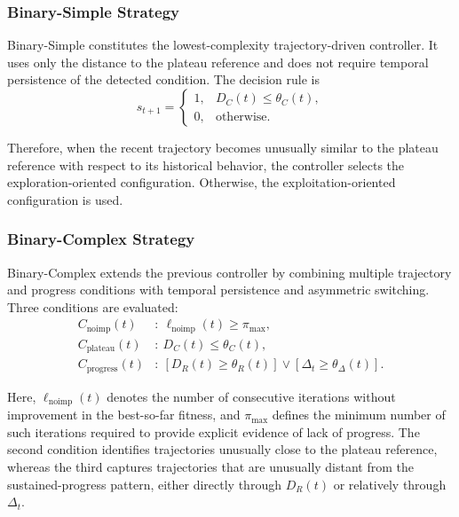 \documentclass[mathematics,article,accept,moreauthors]{Definitions/mdpi}
\begin{document}
\subsubsection{Binary-Simple Strategy}

Binary-Simple constitutes the lowest-complexity trajectory-driven controller.
It uses only the distance to the plateau reference and does not require
temporal persistence of the detected condition. The decision rule is
\begin{equation}
s_{t+1} =
\begin{cases}
1, & D_C(t) \leq \theta_C(t),\\
0, & \text{otherwise}.
\end{cases}
\label{eq:binary_simple}
\end{equation}

Therefore, when the recent trajectory becomes unusually similar to the
plateau reference with respect to its historical behavior, the controller
selects the exploration-oriented configuration. Otherwise, the
exploitation-oriented configuration is used.


\subsubsection{Binary-Complex Strategy}

Binary-Complex extends the previous controller by combining multiple
trajectory and progress conditions with temporal persistence and asymmetric
switching. Three conditions are evaluated:
\begin{align}
C_{\mathrm{noimp}}(t) &:\
\ell_{\mathrm{noimp}}(t) \geq \pi_{\max},
\label{eq:cond_noimp}\\
C_{\mathrm{plateau}}(t) &:\
D_C(t) \leq \theta_C(t),
\label{eq:cond_plateau}\\
C_{\mathrm{progress}}(t) &:\
\left[D_R(t) \geq \theta_R(t)\right]
\lor
\left[\Delta_t \geq \theta_{\Delta}(t)\right].
\label{eq:cond_progress}
\end{align}

Here, $\ell_{\mathrm{noimp}}(t)$ denotes the number of consecutive iterations
without improvement in the best-so-far fitness, and $\pi_{\max}$ defines the
minimum number of such iterations required to provide explicit evidence of
lack of progress. The second condition identifies trajectories unusually
close to the plateau reference, whereas the third captures trajectories that
are unusually distant from the sustained-progress pattern, either directly
through $D_R(t)$ or relatively through $\Delta_t$.
\end{document}
